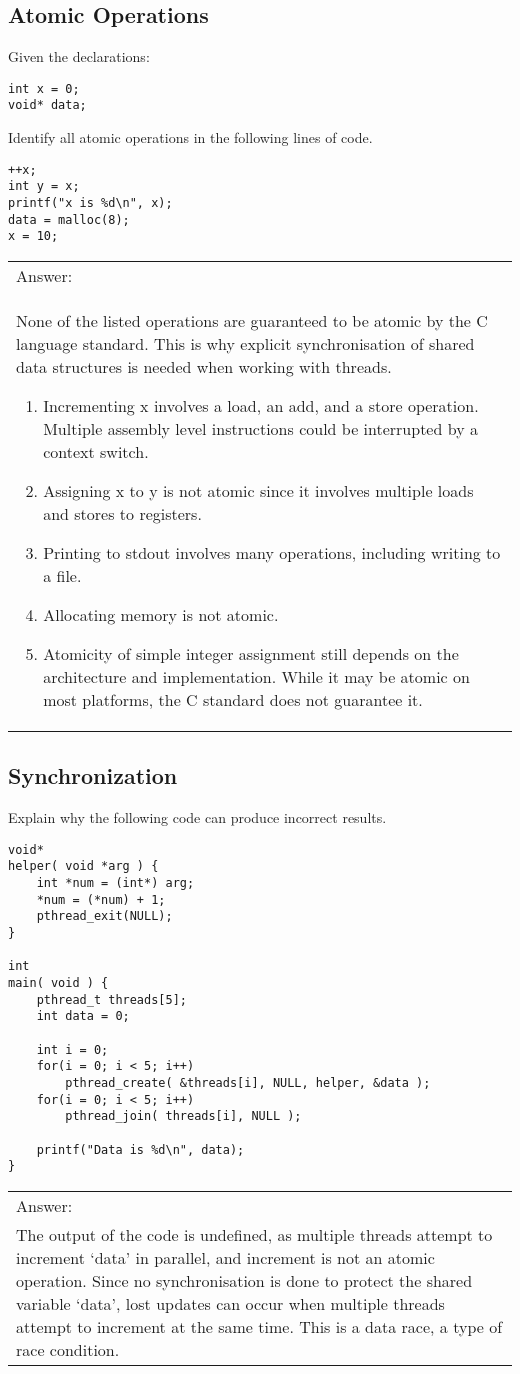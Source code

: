 \documentclass[11pt,a4paper]{article}
\newenvironment{answer}
   {\begin{center}
    \begin{tabular}{|p{0.95\textwidth}|}
    \hline
    }
    { 
    \\\hline
    \end{tabular} 
    \end{center}
    }
\begin{document}
\subsection{Atomic Operations}
Given the declarations:
\begin{lstlisting}
int x = 0;
void* data;
\end{lstlisting}
Identify all atomic operations in the following lines of code.
\begin{lstlisting}
++x;
int y = x;
printf("x is %d\n", x);
data = malloc(8);
x = 10;
\end{lstlisting}
\begin{answer}
\color{red}Answer:\\
None of the listed operations are guaranteed to be atomic by the C language standard. This is why explicit synchronisation of shared data structures is needed when working with threads.
\begin{enumerate}
\item Incrementing x involves a load, an add, and a store operation. Multiple assembly level instructions could be interrupted by a context switch.
\item Assigning x to y is not atomic since it involves multiple loads and stores to registers.
\item Printing to stdout involves many operations, including writing to a file.
\item Allocating memory is not atomic.
\item Atomicity of simple integer assignment still depends on the architecture and implementation. While it may be atomic on most platforms, the C standard does not guarantee it.
\end{enumerate}
\end{answer}
\pagebreak

\subsection{Synchronization}
Explain why the following code can produce incorrect results.
\begin{shaded}
\begin{lstlisting}
void*
helper( void *arg ) {
	int *num = (int*) arg;
	*num = (*num) + 1;
	pthread_exit(NULL);
}

int
main( void ) {
	pthread_t threads[5];
	int data = 0;

	int i = 0;
	for(i = 0; i < 5; i++)
		pthread_create( &threads[i], NULL, helper, &data );
	for(i = 0; i < 5; i++)
		pthread_join( threads[i], NULL );

	printf("Data is %d\n", data);
}
\end{lstlisting}
\end{shaded}
\begin{answer}
\color{red}Answer:\\
The output of the code is undefined, as multiple threads attempt to increment `data' in parallel, and increment is not an atomic operation. Since no synchronisation is done to protect the shared variable `data', lost updates can occur when multiple threads attempt to increment at the same time. This is a data race, a type of race condition.
\end{answer}
\pagebreak
\end{document}
